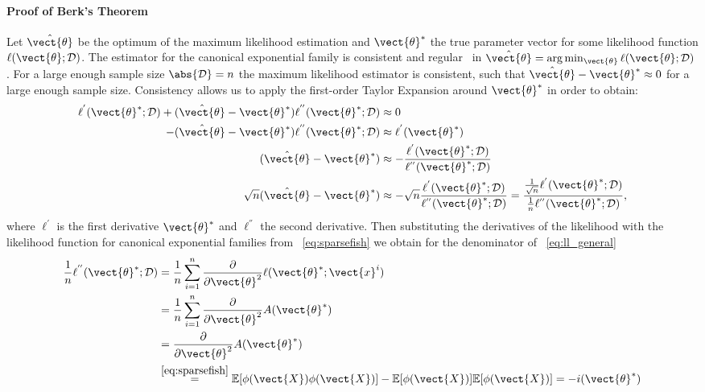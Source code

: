         \paragraph*{Proof of Berk's Theorem}
        Let $\hat{\vect{\theta}}$ be the optimum of the maximum likelihood estimation and $\vect{\theta}^*$ the true parameter vector for some likelihood function $\ell(\vect{\theta}; \mathcal{D})$.
        The estimator for the canonical exponential family is consistent and regular~\cite{berk1972consistency}  in  $\hat{\vect{\theta}} = \arg\min_{\vect{\theta}} \ell(\vect{\theta}; \mathcal{D})$.
        For a large enough sample size $\abs{\mathcal{D}} = n$ the maximum likelihood estimator  is consistent, such that $\hat{\vect{\theta}} - \vect{\theta}^* \approx 0$ for a large enough sample size. 
        Consistency allows us to apply the first-order Taylor Expansion around $\vect{\theta}^*$ in order to obtain:
        \begin{equation}
            \label{eq:ll_general}
            \begin{split}
                 \ell^{'}(\vect{\theta}^*; \mathcal{D}) +(\hat{\vect{\theta}} - \vect{\theta}^*) \ell^{''}(\vect{\theta}^*; \mathcal{D}) &\approx 0 \\
            - (\hat{\vect{\theta}} - \vect{\theta}^*) \ell^{''}(\vect{\theta}^*; \mathcal{D})&  \approx \ell^{'}(\vect{\theta}^*) \\
            (\hat{\vect{\theta}} - \vect{\theta}^*)  &\approx - \frac{ \ell^{'}(\vect{\theta}^*; \mathcal{D}) }{ \ell^{''}(\vect{\theta}^*; \mathcal{D})} \\
            \sqrt{n}(\hat{\vect{\theta}} - \vect{\theta}^*)  &\approx - \sqrt{n} \frac{ \ell^{'}(\vect{\theta}^*; \mathcal{D}) }{ \ell^{''}(\vect{\theta}^*; \mathcal{D})} =  \frac{\frac{1}{\sqrt{n}} \ell^{'}(\vect{\theta}^*; \mathcal{D}) }{ \frac{1}{n}\ell^{''}(\vect{\theta}^*; \mathcal{D})}, \\
            \end{split}
        \end{equation}
        where $\ell^{'}$ is the first derivative \wrt $\vect{\theta}^*$ and $\ell^{''}$ the second derivative.
      Then substituting the derivatives of the likelihood with the likelihood function for canonical exponential families from \eq~\ref{eq:sparsefish} we obtain for the denominator of \eq~\ref{eq:ll_general}
      \begin{equation}
        \begin{split}
        \frac{1}{n}\ell^{''}(\vect{\theta}^*; \mathcal{D}) &= \frac{1}{n} \sum_{i=1}^n \frac{\partial}{\partial \vect{\theta}^2} \ell (\vect{\theta}^*; \vect{x}^i)\\
        &= \frac{1}{n} \sum_{i=1}^n \frac{\partial}{\partial \vect{\theta}^2} A(\vect{\theta}^*)\\
        & = \frac{\partial}{\partial \vect{\theta}^2}  A(\vect{\theta}^*)  \\
        &\stackrel{\ref{eq:sparsefish}}{=} \mathbb{E}[\phi(\vect{X}) \phi(\vect{X})] - \mathbb{E}[\phi(\vect{X})] \mathbb{E}[\phi(\vect{X})] = - i(\vect{\theta}^*)
        \end{split}
      \end{equation}
